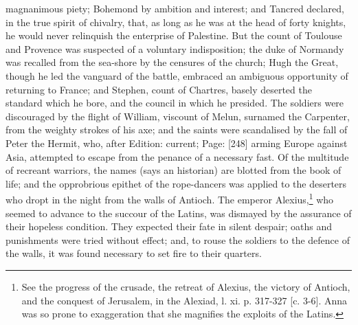 magnanimous piety; Bohemond by ambition and interest; and Tancred declared, in the true spirit of chivalry, that, as long as he was at the head of forty knights, he would never relinquish the enterprise of Palestine. But the count of Toulouse and Provence was suspected of a voluntary indisposition; the duke of Normandy was recalled from the sea-shore by the censures of the church; Hugh the Great, though he led the vanguard of the battle, embraced an ambiguous opportunity of returning to France; and Stephen, count of Chartres, basely deserted the standard which he bore, and the council in which he presided. The soldiers were discouraged by the flight of William, viscount of Melun, surnamed the Carpenter, from the weighty strokes of his axe; and the saints were scandalised by the fall of Peter the Hermit, who, after Edition: current; Page: [248] arming Europe against Asia, attempted to escape from the penance of a necessary fast. Of the multitude of recreant warriors, the names (says an historian) are blotted from the book of life; and the opprobrious epithet of the rope-dancers was applied to the deserters who dropt in the night from the walls of Antioch. The emperor Alexius,\footnote{See the progress of the crusade, the retreat of Alexius, the victory of Antioch, and the conquest of Jerusalem, in the Alexiad, l. xi. p. 317-327 [c. 3-6]. Anna was so prone to exaggeration that she magnifies the exploits of the Latins.} who seemed to advance to the succour of the Latins, was dismayed by the assurance of their hopeless condition. They expected their fate in silent despair; oaths and punishments were tried without effect; and, to rouse the soldiers to the defence of the walls, it was found necessary to set fire to their quarters.

